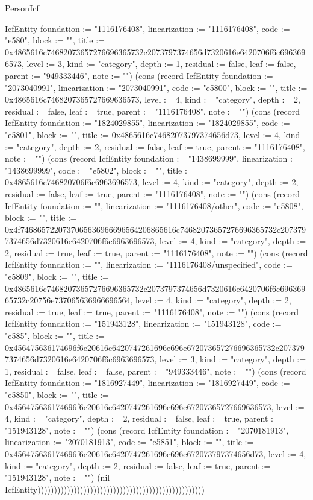 \begin{lexlean}{PersonIcf}
\begin{semanticmodule}
{IcfEntity {foundation := "1116176408", linearization := "1116176408", code := "e580", block := "", title := 0x4865616c74682073657276696365732c2073797374656d7320616e6420706f6c6963696573, level := 3, kind := "category", depth := 1, residual := false, leaf := false, parent := "949333446", note := ""}) (cons (record IcfEntity {foundation := "2073040991", linearization := "2073040991", code := "e5800", block := "", title := 0x4865616c7468207365727669636573, level := 4, kind := "category", depth := 2, residual := false, leaf := true, parent := "1116176408", note := ""}) (cons (record IcfEntity {foundation := "1824029855", linearization := "1824029855", code := "e5801", block := "", title := 0x4865616c74682073797374656d73, level := 4, kind := "category", depth := 2, residual := false, leaf := true, parent := "1116176408", note := ""}) (cons (record IcfEntity {foundation := "1438699999", linearization := "1438699999", code := "e5802", block := "", title := 0x4865616c746820706f6c6963696573, level := 4, kind := "category", depth := 2, residual := false, leaf := true, parent := "1116176408", note := ""}) (cons (record IcfEntity {foundation := "", linearization := "1116176408/other", code := "e5808", block := "", title := 0x4f7468657220737065636966696564206865616c74682073657276696365732c2073797374656d7320616e6420706f6c6963696573, level := 4, kind := "category", depth := 2, residual := true, leaf := true, parent := "1116176408", note := ""}) (cons (record IcfEntity {foundation := "", linearization := "1116176408/unspecified", code := "e5809", block := "", title := 0x4865616c74682073657276696365732c2073797374656d7320616e6420706f6c69636965732c20756e737065636966696564, level := 4, kind := "category", depth := 2, residual := true, leaf := true, parent := "1116176408", note := ""}) (cons (record IcfEntity {foundation := "151943128", linearization := "151943128", code := "e585", block := "", title := 0x456475636174696f6e20616e6420747261696e696e672073657276696365732c2073797374656d7320616e6420706f6c6963696573, level := 3, kind := "category", depth := 1, residual := false, leaf := false, parent := "949333446", note := ""}) (cons (record IcfEntity {foundation := "1816927449", linearization := "1816927449", code := "e5850", block := "", title := 0x456475636174696f6e20616e6420747261696e696e67207365727669636573, level := 4, kind := "category", depth := 2, residual := false, leaf := true, parent := "151943128", note := ""}) (cons (record IcfEntity {foundation := "2070181913", linearization := "2070181913", code := "e5851", block := "", title := 0x456475636174696f6e20616e6420747261696e696e672073797374656d73, level := 4, kind := "category", depth := 2, residual := false, leaf := true, parent := "151943128", note := ""}) (nil IcfEntity)))))))))))))))))))))))))))))))))))))))))))))))))))
}


\end{semanticmodule}
\end{lexlean}
